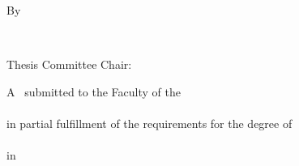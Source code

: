 
\vspace*{\fill}

\begin{singlespace}
    \begin{center}
        \mytitle
        
        \vspace{0.7in}
        
        By
        
        \vspace{0.7in}
        
        \myname\\
        \mypreviousdegrees
        
        \vspace{0.75in}
        
        Thesis Committee Chair: \advisor
        
        \vspace{2.5in}
        
        A \mydoctype~submitted to the Faculty of the\\
        \myschool\\
        in partial fulfillment of the requirements for the degree of \\
        \mydegree\\
        in \mydepartment\\
        \myyear
    \end{center}
\end{singlespace}

\vfill
\newpage
